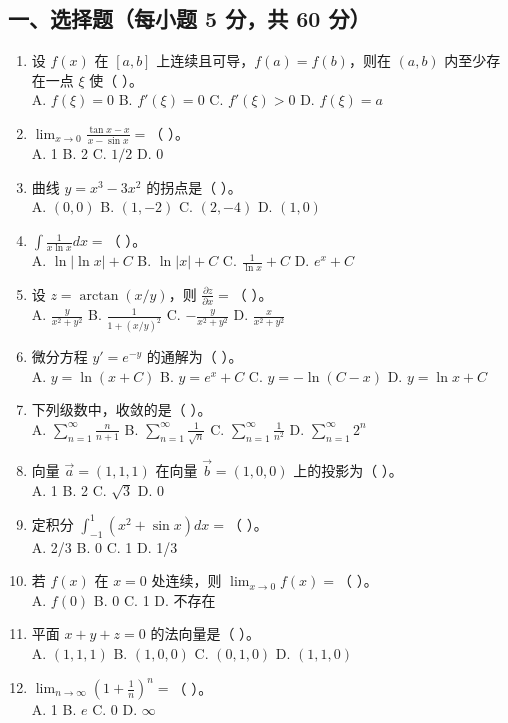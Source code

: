 \documentclass[11pt,a4paper]{article}
\begin{document}
\subsection*{一、选择题（每小题 5 分，共 60 分）}
\begin{enumerate}
    \item 设 $f(x)$ 在 $[a,b]$ 上连续且可导，$f(a)=f(b)$，则在 $(a,b)$ 内至少存在一点 $\xi$ 使（ ）。 \\
    A. $f(\xi)=0$ \quad B. $f'(\xi)=0$ \quad C. $f'(\xi)>0$ \quad D. $f(\xi)=a$
    \item $\lim_{x \to 0} \frac{\tan x - x}{x - \sin x} = $（ ）。 \\
    A. 1 \quad B. 2 \quad C. $1/2$ \quad D. 0
    \item 曲线 $y = x^3 - 3x^2$ 的拐点是（ ）。 \\
    A. $(0,0)$ \quad B. $(1,-2)$ \quad C. $(2,-4)$ \quad D. $(1,0)$
    \item $\int \frac{1}{x \ln x} dx = $（ ）。 \\
    A. $\ln|\ln x| + C$ \quad B. $\ln|x| + C$ \quad C. $\frac{1}{\ln x} + C$ \quad D. $e^x + C$
    \item 设 $z = \arctan(x/y)$，则 $\frac{\partial z}{\partial x} = $（ ）。 \\
    A. $\frac{y}{x^2+y^2}$ \quad B. $\frac{1}{1+(x/y)^2}$ \quad C. $-\frac{y}{x^2+y^2}$ \quad D. $\frac{x}{x^2+y^2}$
    \item 微分方程 $y' = e^{-y}$ 的通解为（ ）。 \\
    A. $y = \ln(x+C)$ \quad B. $y = e^x + C$ \quad C. $y = -\ln(C-x)$ \quad D. $y = \ln x + C$
    \item 下列级数中，收敛的是（ ）。 \\
    A. $\sum_{n=1}^{\infty} \frac{n}{n+1}$ \quad B. $\sum_{n=1}^{\infty} \frac{1}{\sqrt{n}}$ \quad C. $\sum_{n=1}^{\infty} \frac{1}{n^2}$ \quad D. $\sum_{n=1}^{\infty} 2^n$
    \item 向量 $\vec{a}=(1,1,1)$ 在向量 $\vec{b}=(1,0,0)$ 上的投影为（ ）。 \\
    A. 1 \quad B. 2 \quad C. $\sqrt{3}$ \quad D. 0
    \item 定积分 $\int_{-1}^1 (x^2 + \sin x) dx = $（ ）。 \\
    A. 2/3 \quad B. 0 \quad C. 1 \quad D. 1/3
    \item 若 $f(x)$ 在 $x=0$ 处连续，则 $\lim_{x \to 0} f(x) = $（ ）。 \\
    A. $f(0)$ \quad B. 0 \quad C. 1 \quad D. 不存在
    \item 平面 $x+y+z=0$ 的法向量是（ ）。 \\
    A. $(1, 1, 1)$ \quad B. $(1, 0, 0)$ \quad C. $(0, 1, 0)$ \quad D. $(1, 1, 0)$
    \item $\lim_{n \to \infty} (1 + \frac{1}{n})^n = $（ ）。 \\
    A. 1 \quad B. $e$ \quad C. 0 \quad D. $\infty$
\end{enumerate}
\end{document}
